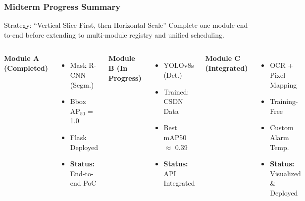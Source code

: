 \documentclass[aspectratio=169]{beamer}
\begin{document}
\begin{frame}
\frametitle{Midterm Progress Summary}
\vspace{-5pt}
\small
\begin{block}{Strategy: ``Vertical Slice First, then Horizontal Scale''}
Complete one module end-to-end before extending to multi-module registry and unified scheduling.
\end{block}
\vspace{4pt}
\begin{columns}[T]
\textbf{\color{green!70!black}Module A (Completed)}
\begin{itemize}
  \item Mask R-CNN (Segm.)
  \item Bbox AP$_{50}$ = 1.0
  \item Flask Deployed
  \item \textbf{Status:} End-to-end PoC
\end{itemize}

\textbf{\color{orange!80!black}Module B (In Progress)}
\begin{itemize}
  \item YOLOv8s (Det.)
  \item Trained: CSDN Data
  \item Best mAP50 $\approx$ 0.39
  \item \textbf{Status:} API Integrated
\end{itemize}

\textbf{\color{orange!80!black}Module C (Integrated)}
\begin{itemize}
  \item OCR + Pixel Mapping
  \item Training-Free
  \item Custom Alarm Temp.
  \item \textbf{Status:} Visualized \& Deployed
\end{itemize}
\end{columns}
\end{frame}
\end{document}

